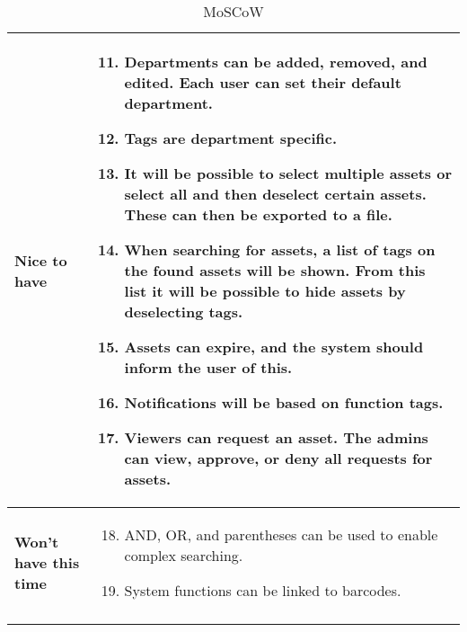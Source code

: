 \begin{longtable}{p{3.2cm} p{10cm}}
        \textbf{Nice to have} &     
        \vspace*{-7mm}
        \begin{enumerate} \setcounter{enumi}{10} \itemsep0em 
            \item Departments can be added, removed, and edited. Each user can set their default department.
            
            \item Tags are department specific.
            
            \item It will be possible to select multiple assets or select all and then deselect certain assets. These can then be exported to a file.
            
            \item When searching for assets, a list of tags on the found assets will be shown. From this list it will be possible to hide assets by deselecting tags.
            
            \item Assets can expire, and the system should inform the user of this.
            
            \item Notifications will be based on function tags.
            
            \item Viewers can request an asset. The admins can view, approve, or deny all requests for assets.
            
        \end{enumerate}
        \\
        \hline
        \textbf{Won't have this time} & 
        \vspace*{-7mm}
        \begin{enumerate} \setcounter{enumi}{17} \itemsep0em 
            \item AND, OR, and parentheses can be used to enable complex searching.
            \item System functions can be linked to barcodes.
        \end{enumerate}
        \\
        \hline
    \caption{MoSCoW}
    \label{tab:moscow}
   
\end{longtable}